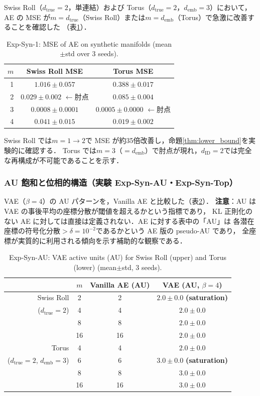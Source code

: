 \documentclass[11pt,a4paper]{jsarticle}
\newcommand{\dID}{d_{\mathrm{ID}}}
\newcommand{\dtrue}{d_{\mathrm{true}}}
\newcommand{\demb}{d_{\mathrm{emb}}}
\begin{document}
Swiss Roll（$\dtrue = 2$，単連結）および Torus（$\dtrue = 2$，$\demb = 3$）において，
AE の MSE が$m = \dtrue$（Swiss Roll）または$m = \demb$（Torus）で急激に改善することを確認した
（表\ref{tab:e1}）．

\begin{table}[H]
\centering
\caption{Exp-Syn-1: MSE of AE on synthetic manifolds (mean$\pm$std over 3 seeds).}
\label{tab:e1}
\small
\begin{tabular}{rcc}
\toprule
$m$ & Swiss Roll MSE & Torus MSE \\
\midrule
1 & $1.016\pm0.057$ & $0.388\pm0.017$ \\
2 & $\boldsymbol{0.029\pm0.002}$ $\leftarrow$肘点 & $0.085\pm0.004$ \\
3 & $0.0008\pm0.0001$ & $\boldsymbol{0.0005\pm0.0000}$ $\leftarrow$肘点 \\
4 & $0.041\pm0.015$ & $0.019\pm0.002$ \\
\bottomrule
\end{tabular}
\end{table}

Swiss Roll では$m = 1 \to 2$で MSE が約35倍改善し，命題\ref{thm:lower_bound}を実験的に確認する．
Torus では$m = 3$（$= \demb$）で肘点が現れ，$\dID = 2$では完全な再構成が不可能であることを示す．

\subsubsection{AU 飽和と位相的構造（実験 Exp-Syn-AU・Exp-Syn-Top）}

VAE（$\beta = 4$）の AU パターンを，Vanilla AE と比較した（表\ref{tab:ea_summary}）．
\textbf{注意}：AU は VAE の事後平均の座標分散が閾値を超えるかという指標であり，
KL 正則化のない AE に対しては直接は定義されない．AE に対する表中の「AU」は
各潜在座標の符号化分散$> \delta = 10^{-2}$であるかという AE 版の pseudo-AU であり，
全座標が実質的に利用される傾向を示す補助的な観察である．

\begin{table}[H]
\centering
\caption{Exp-Syn-AU: VAE active units (AU) for Swiss Roll (upper) and Torus (lower) (mean$\pm$std, 3 seeds).}
\label{tab:ea_summary}
\small
\begin{tabular}{rccc}
\toprule
 & $m$ & Vanilla AE (AU) & VAE (AU, $\beta=4$) \\
\midrule
Swiss Roll & 2 & 2 & $2.0\pm0.0$ \textbf{(saturation)} \\
($d_\mathrm{true}=2$) & 4 & 4 & $2.0\pm0.0$ \\
 & 8 & 8 & $2.0\pm0.0$ \\
 & 16 & 16 & $2.0\pm0.0$ \\
\midrule
Torus & 4 & 4 & $2.0\pm0.0$ \\
($d_\mathrm{true}=2$, $d_\mathrm{emb}=3$) & 6 & 6 & $3.0\pm0.0$ \textbf{(saturation)} \\
 & 8 & 8 & $3.0\pm0.0$ \\
 & 16 & 16 & $3.0\pm0.0$ \\
\bottomrule
\end{tabular}
\end{table}
\end{document}
